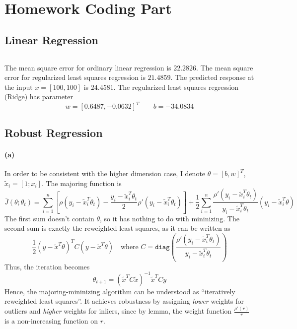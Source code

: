 \documentclass[12pt]{article}
\begin{document}
\setcounter{section}{2}
\section{Homework Coding Part}
\subsection{Linear Regression}
\inputminted[frame=single,framesep=10pt,linenos,xleftmargin=\parindent]{octave}{./hw3/problem1/Linear_regression.m}
The mean square error for ordinary linear regression is \(22.2826\).
The mean square error for regularized least squares regression is \(21.4859\).
The predicted response at the input \(x=[100, 100]\) is \(24.4581\).
The regularized least squares regression (Ridge) has parameter
\[ w=[ 0.6487, -0.0632]^T \hspace{2em} b=-34.0834 \]
\subsection{Robust Regression}
\paragraph{(a)}
In order to be consistent with the higher dimension case, I denote \(\theta=[b, w]^T\), \(\tilde{x}_i=[1; x_i]\).
The majoring function is
\[ \bar{J} (\theta;\theta_t)=\sum_{i=1}^{n}\left[\rho(y_i-\tilde{x}_i^T\theta_t)-\frac{y_i-\tilde{x}_i^T\theta_t}{2}\rho'(y_i-\tilde{x}_i^T\theta_t) \right]+\frac{1}{2}\sum_{i=1}^{n}\frac{\rho'(y_i-\tilde{x}_i^T\theta_t)}{y_i-\tilde{x}_i^T\theta_t}\left(y_i-\tilde{x}_i^T\theta\right) \]
The first sum doesn't contain \(\theta\), so it has nothing to do with mininizing.
The second sum is exactly the reweighted least squares, as it can be written as
\[ \frac{1}{2}(y-\tilde{x}^T\theta)^T C (y-\tilde{x}^T\theta) \hspace{1em}\textrm{where } C=\texttt{diag}\left(\frac{\rho'(y_i-\tilde{x}_i^T\theta_t)}{y_i-\tilde{x}_i^T\theta_t}\right) \]
Thus, the iteration becomes
\[ \theta_{t+1}=\left(\tilde{x}^TC\tilde{x}\right)^{-1}\tilde{x}^TCy \]
Hence, the majoring-mininizing algorithm can be understood as ``iteratively reweighted least squares''.
It achieves robustness by assigning \emph{lower} weights for outliers and \emph{higher} weights for inliers, since by lemma, the weight function \(\frac{\rho'(r)}{r}\) is a non-increasing function on \(r\).
\end{document}
